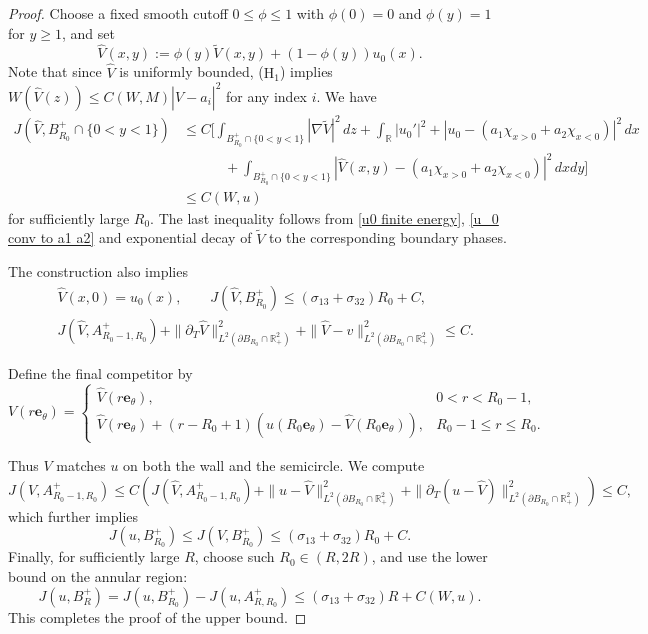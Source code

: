 \documentclass[leqno,11pt]{amsart}
\let\pa=\partial
\let\pa=\partial
\let\na=\nabla
\theoremstyle{remark}
\newcommand{\BR}{\mathbb{R}}
\begin{document}
\begin{proof}
Choose a fixed smooth cutoff $0\le\phi\le1$ with
$\phi(0)=0$ and $\phi(y)=1$ for $y\ge1$, and set
\[
\hat{V}(x,y):=
\phi(y)\tilde  V(x,y)+(1-\phi(y))u_0(x).
\]
Note that since $\hat{V}$ is uniformly bounded, ($\mathrm{H}_1$) implies $W(\hat{V}(z))\leq C(W,M) |\hat{V}-a_i|^2$ for any index $i$. We have 
\begin{align*}
    J(\hat{V},B_{R_0}^+\cap\{0<y<1\})&\leq  C\bigg[\int_{B_{R_0}^+\cap\{0<y<1\}} |\na \tilde{V}|^2\,dz+ \int_\BR |u_0'|^2 +|u_0-(a_1\chi_{x>0}+a_2\chi_{x<0})|^2\,dx \\
    &\qquad\quad+ \int_{B_{R_0}^+\cap\{0<y<1\}} |\hat{V}(x,y)-(a_1\chi_{x>0}+a_2\chi_{x<0})|^2\,dxdy\bigg]\,\\
    &\leq C(W,u)
\end{align*}
for sufficiently large $R_0$. The last inequality follows from \eqref{u0 finite energy}, \eqref{u_0 conv to a1 a2} and exponential decay of $\tilde{V}$ to the corresponding boundary phases. 

The construction also implies
\begin{align}
   \nonumber &\hat{V}(x,0)=u_0(x),\qquad J(\hat V,B_{R_0}^+)\le (\sigma_{13}+\sigma_{32})R_0+C,\\
\label{hat V in annulus}&J(\hat V, A_{R_0-1,R_0}^+)+\|\partial_T\hat{V}\|_{L^2(\pa B_{R_0}\cap\BR_+^2)}^2+
              \|\hat V-v\|_{L^2(\pa B_{R_0}\cap\BR_+^2)}^2\le C.
\end{align}


Define the final competitor by
\begin{equation*}
    V(r\mathbf{e}_\theta)=\begin{cases}
        \hat{V}(r\mathbf{e}_\theta), & 0<r<R_0-1,\\
        \hat{V}(r\mathbf{e}_\theta)+(r-R_0+1) (u(R_0\mathbf{e}_\theta)-\hat{V}(R_0\mathbf{e}_\theta)), & R_0-1\leq r\leq R_0.
    \end{cases}
\end{equation*}

Thus $V$ matches $u$ on both the wall
and the semicircle. We compute
\[
J(V,A_{R_0-1,R_0}^+)\leq C\left(J(\hat V,A_{R_0-1,R_0}^+)+\|u-\hat V\|_{L^2(\pa B_{R_0}\cap\BR_+^2)}^2+\|\partial_T(u-\hat V)\|_{L^2(\pa B_{R_0}\cap\BR_+^2)}^2\right)
\leq C,
\]
which further implies 
\begin{equation*}
    J(u,B_{R_0}^+)\leq J(V,B_{R_0}^+)\leq (\sigma_{13}+\sigma_{32})R_0+C. 
\end{equation*}
Finally, for sufficiently large $R$, choose such $R_0\in(R,2R)$, and use the lower bound on the annular region:
\[
J(u,B_{R}^+)=J(u,B_{R_0}^+)-J(u,A^+_{R,R_0})\leq (\sigma_{13}+\sigma_{32})R+C(W,u). 
\]
This completes the proof of the upper bound.


\end{proof}
\end{document}
